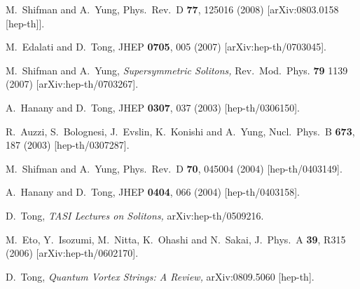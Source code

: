 \documentclass[12pt]{article}
\begin{document}
%
%
\small
\begin{thebibliography}{99}
\itemsep -2pt

  M.~Shifman and A.~Yung,
  Phys.\ Rev.\  D {\bf 77}, 125016 (2008)
  [arXiv:0803.0158 [hep-th]].
     
  M.~Edalati and D.~Tong,
  JHEP {\bf 0705}, 005 (2007)
  [arXiv:hep-th/0703045].
   
M.~Shifman and A.~Yung,
{\sl Supersymmetric Solitons,}
Rev.\ Mod.\ Phys. {\bf 79} 1139 (2007)
[arXiv:hep-th/0703267].


A.~Hanany and D.~Tong,
JHEP {\bf 0307}, 037 (2003)
[hep-th/0306150].

R.~Auzzi, S.~Bolognesi, J.~Evslin, K.~Konishi and A.~Yung,
Nucl.\ Phys.\ B {\bf 673}, 187 (2003)
[hep-th/0307287].

M.~Shifman and A.~Yung,
Phys.\ Rev.\ D {\bf 70}, 045004 (2004)
[hep-th/0403149].

A.~Hanany and D.~Tong,
JHEP {\bf 0404}, 066 (2004)
[hep-th/0403158].

D.~Tong,
{\em TASI Lectures on Solitons,}
  arXiv:hep-th/0509216.
 
  M.~Eto, Y.~Isozumi, M.~Nitta, K.~Ohashi and N.~Sakai,
  J.\ Phys.\ A  {\bf 39}, R315 (2006)
  [arXiv:hep-th/0602170].
   
D.~Tong,
{\em Quantum Vortex Strings: A Review,}
  arXiv:0809.5060 [hep-th].
  

\end{thebibliography}
\end{document}
